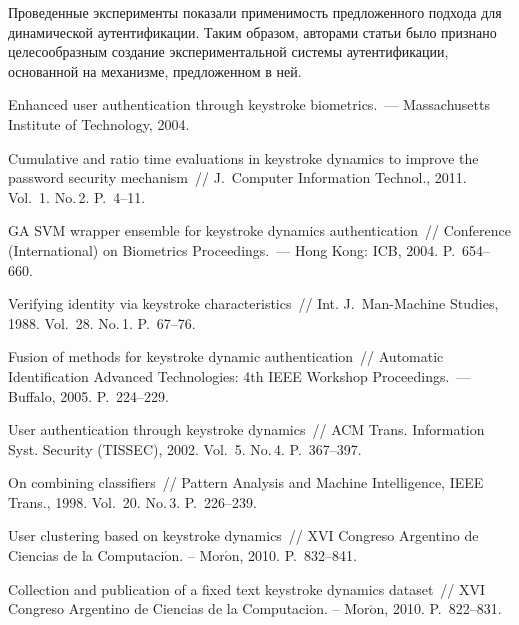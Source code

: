 \begin{multicols}{2}
Проведенные эксперименты показали применимость предложенного подхода
для динамической аутентификации. Таким образом, авторами статьи было
признано целесообразным создание экспериментальной системы
аутентификации, основанной на механизме, предложенном в ней.

{\small\frenchspacing
{%
\begin{thebibliography}{99}



 Enhanced user authentication
through keystroke biometrics.~--- Massachusetts Institute of
Technology, 2004.

 Cumulative and ratio
time evaluations in keystroke dynamics to improve the password
security mechanism~// J.~Computer Information
Technol., 2011.  Vol.~1. No.\,2. P.~4--11.

 GA SVM  wrapper ensemble for keystroke
dynamics authentication~//  Conference (International) on
Biometrics Proceedings.~--- Hong Kong: ICB, 2004. P.~654--660.

 Verifying identity via keystroke
characteristics~// Int. J.~Man-Machine Studies,
1988. Vol.~28. No.\,1. P.~67--76.

 Fusion of methods for
keystroke dynamic authentication~// Automatic Identification
Advanced Technologies: 4th IEEE Workshop Proceedings.~--- Buffalo, 2005.
P.~224--229.

 User authentication
through keystroke dynamics~// ACM Trans. Information 
Syst. Security (TISSEC), 2002. Vol.~5. No.\,4. P.~367--397.

 On combining
classifiers~// Pattern Analysis and Machine Intelligence, IEEE
Trans., 1998. Vol.~20. No.\,3. P.~226--239.

 User clustering
based on keystroke dynamics~// XVI Congreso Argentino de Ciencias de
la Computaci$\acute{\mbox{o}}$n. -- Mor$\acute{\mbox{o}}$n, 2010. P.~832--841.

 Collection and publication of a fixed text keystroke
dynamics dataset~// XVI Congreso Argentino de Ciencias de la
Computaci$\acute{\mbox{o}}$n. -- Mor$\acute{\mbox{o}}$n, 2010. P.~822--831.


\end{thebibliography}}}
\end{multicols}
